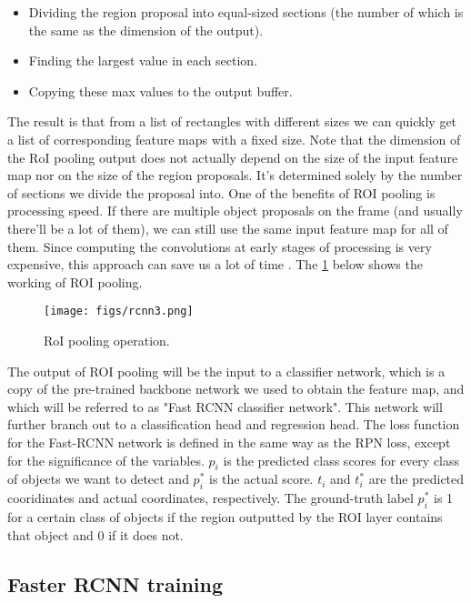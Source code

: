 \begin{itemize}
	\item Dividing the region proposal into equal-sized sections (the number of which is the same as the dimension of the output).
	\item Finding the largest value in each section.
	\item Copying these max values to the output buffer.
\end{itemize}

The result is that from a list of rectangles with different sizes we can quickly get a list of corresponding feature maps with a fixed size. Note that the dimension of the RoI pooling output does not actually depend on the size of the input feature map nor on the size of the region proposals. It’s determined solely by the number of sections we divide the proposal into. One of the benefits of ROI pooling is processing speed. If there are multiple object proposals on the frame (and usually there’ll be a lot of them), we can still use the same input feature map for all of them. Since computing the convolutions at early stages of processing is very expensive, this approach can save us a lot of time \cite{b1}. The \cref{fig:rcnn3} below shows the working of ROI pooling.

\begin{figure}[!htpb]
	\centering
	\texttt{[image: figs/rcnn3.png]}
	\caption{RoI pooling operation.}\label{fig:rcnn3}
\end{figure}

The output of ROI pooling will be the input to a classifier network, which is a copy of the pre-trained backbone network we used to obtain the feature map, and which will be referred to as "Fast RCNN classifier network". This network will further branch out to a classification head and regression head. The loss function for the Fast-RCNN network is defined in the same way as the RPN loss, except for the significance of the variables. $p_{i}$ is the predicted class scores for every class of objects we want to detect and $p_{i}^*$ is the actual score. $t_{i}$ and $t_{i}^*$ are the predicted cooridinates and actual coordinates, respectively. The ground-truth label $p_{i}^*$ is 1 for a certain class of objects if the region outputted by the ROI layer contains that object and 0 if it does not.

\subsection{Faster RCNN training}

